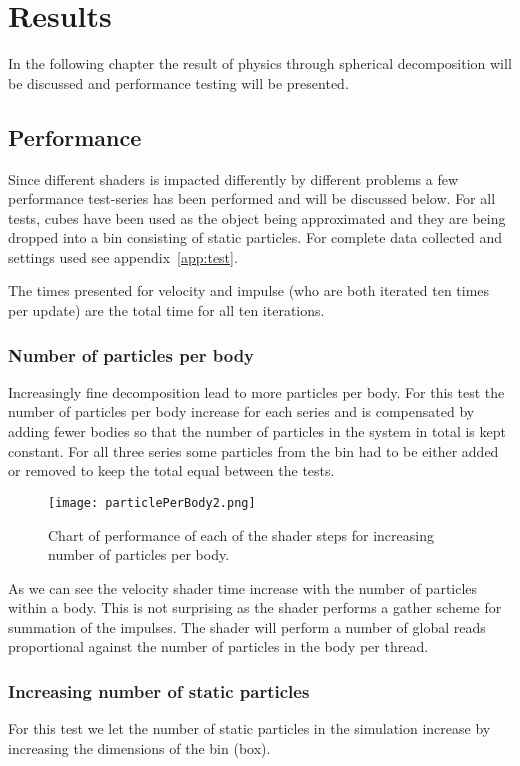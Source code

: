 \chapter{Results}
In the following chapter the result of physics through spherical decomposition will
be discussed and performance testing will be presented.

\section{Performance}
Since different shaders is impacted differently by different problems a few performance
test-series has been performed and will be discussed below.
For all tests, cubes have been used as the object being approximated and they
are being dropped into a bin consisting of static particles. For complete data collected and
settings used see appendix~\ref{app:test}.

The times presented for velocity and impulse (who are both iterated ten times per update)
 are the total time for all ten iterations.

\subsection{Number of particles per body}
Increasingly fine decomposition lead to more particles per body.
For this test the number of particles per body increase for each series and is
compensated by adding fewer bodies so that the number of particles in the system
in total is kept constant. For all three series some particles from the bin had to be
either added or removed to keep the total equal between the tests.
\begin{figure}[H]
  \centering
  \texttt{[image: particlePerBody2.png]}
  \caption{Chart of performance of each of the shader steps for increasing number of particles per body.}
  \label{fig:particlePerBody}
\end{figure}
As we can see the velocity shader time increase with the number of particles
within a body. This is not surprising as the shader performs a gather scheme for
summation of the impulses. The shader will perform a number of global reads proportional
against the number of particles in the body per thread.

\subsection{Increasing number of static particles}
For this test we let the number of static particles in the simulation increase
by increasing the dimensions of the bin (box).

